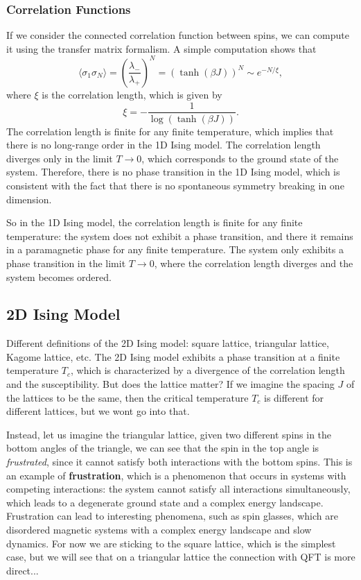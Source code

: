 \subsubsection{Correlation Functions}

If we consider the connected correlation function between spins, we can compute it using the transfer matrix formalism. A simple computation shows that
\[
    \langle \sigma_1 \sigma_N \rangle = \left(\frac{\lambda_-}{\lambda_+}\right)^{N} = \left(\tanh(\beta J)\right)^{N} \sim e^{-N/\xi},
\]
where \(\xi\) is the correlation length, which is given by
\[
    \xi = -\frac{1}{\log(\tanh(\beta J))}.
\]
The correlation length is finite for any finite temperature, which implies that there is no long-range order in the 1D Ising model. The correlation length diverges only in the limit \(T \to 0\), which corresponds to the ground state of the system. Therefore, there is no phase transition in the 1D Ising model, which is consistent with the fact that there is no spontaneous symmetry breaking in one dimension.

So in the 1D Ising model, the correlation length is finite for any finite temperature: the system does not exhibit a phase transition, and there it remains in a paramagnetic phase for any finite temperature. The system only exhibits a phase transition in the limit \(T \to 0\), where the correlation length diverges and the system becomes ordered. 

\subsection{2D Ising Model}

Different definitions of the 2D Ising model: square lattice, triangular lattice, Kagome lattice, etc. The 2D Ising model exhibits a phase transition at a finite temperature \(T_c\), which is characterized by a divergence of the correlation length and the susceptibility. But does the lattice matter? If we imagine the spacing \(J\) of the lattices to be the same, then the critical temperature \(T_c\) is different for different lattices, but we wont go into that.

Instead, let us imagine the triangular lattice, given two different spins in the bottom angles of the triangle, we can see that the spin in the top angle is \textit{frustrated}, since it cannot satisfy both interactions with the bottom spins. This is an example of \textbf{frustration}, which is a phenomenon that occurs in systems with competing interactions: the system cannot satisfy all interactions simultaneously, which leads to a degenerate ground state and a complex energy landscape. Frustration can lead to interesting phenomena, such as spin glasses, which are disordered magnetic systems with a complex energy landscape and slow dynamics. For now we are sticking to the square lattice, which is the simplest case, but we will see that on a triangular lattice the connection with QFT is more direct...

